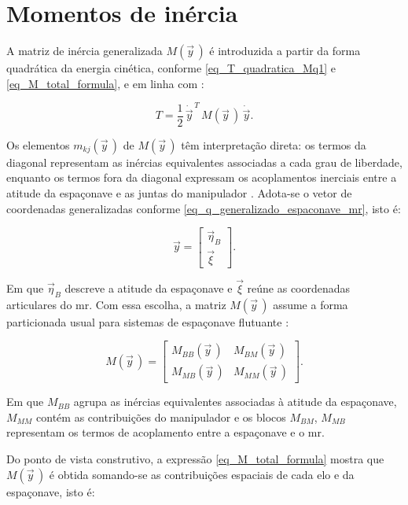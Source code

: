 \section{Momentos de inércia}
\label{sec:dinAcoplada_momentos_inercia}

A matriz de inércia generalizada $M(\vec y\,)$ é introduzida a partir da
forma quadrática da energia cinética, conforme \eqref{eq_T_quadratica_Mq1} e \eqref{eq_M_total_formula}, e em linha com \cite{spong2006robot,featherstone2008}:

\begin{equation}
T =
\frac{1}{2}\,\dot{\vec y}^{\,T}\,M(\vec y\,)\,\dot{\vec y}.
\label{eq_T_quadratica_Mq_reprise}
\end{equation}


Os elementos $m_{kj}(\vec y\,)$ de $M(\vec y\,)$ têm interpretação direta:
os termos da diagonal representam as inércias equivalentes associadas a
cada grau de liberdade, enquanto os termos fora da diagonal expressam os
acoplamentos inerciais entre a atitude da espaçonave e as juntas do
manipulador \cite{Geradin2004}.
Adota-se o vetor de coordenadas generalizadas conforme
\eqref{eq_q_generalizado_espaconave_mr}, isto é:

\begin{equation}
\vec y
=
\begin{bmatrix}
\vec\eta_B \\
\vec\xi
\end{bmatrix}.
\end{equation}

Em que $\vec\eta_B$ descreve a atitude da espaçonave e $\vec\xi$ reúne as
coordenadas articulares do \gls{mr}. Com essa escolha, a matriz
$M(\vec y\,)$ assume a forma particionada usual para sistemas de espaçonave
flutuante \cite{featherstone2008,Wilde2018}:

\begin{equation}
M(\vec y\,) =
\begin{bmatrix}
M_{BB}(\vec y\,) & M_{BM}(\vec y\,) \\
M_{MB}(\vec y\,) & M_{MM}(\vec y\,)
\end{bmatrix}.
\label{eq_M_blocos}
\end{equation}

Em que $M_{BB}$ agrupa as inércias equivalentes associadas à atitude da
espaçonave, $M_{MM}$ contém as contribuições do manipulador e os blocos
$M_{BM}$, $M_{MB}$ representam os termos de acoplamento entre a
espaçonave e o \gls{mr}.

Do ponto de vista construtivo, a expressão
\eqref{eq_M_total_formula} mostra que $M(\vec y\,)$ é obtida
somando-se as contribuições espaciais de cada elo e da espaçonave, isto é:

